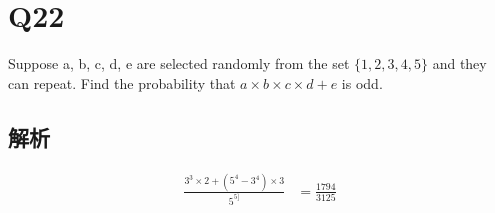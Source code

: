 \section{Q22}

  Suppose a, b, c, d, e are selected randomly from the set
  $ \{ 1, 2, 3, 4, 5 \} $ and they can repeat. Find the probability that
  $ a \times b \times c \times d + e $ is odd.

  \subsection{解析}

    \begin{align*}
      \frac{3^3 \times 2 + \left( 5^{4} - 3^{4} \right) \times 3}{5^{5]}}
      &= \frac{1794}{3125}
    \end{align*}

